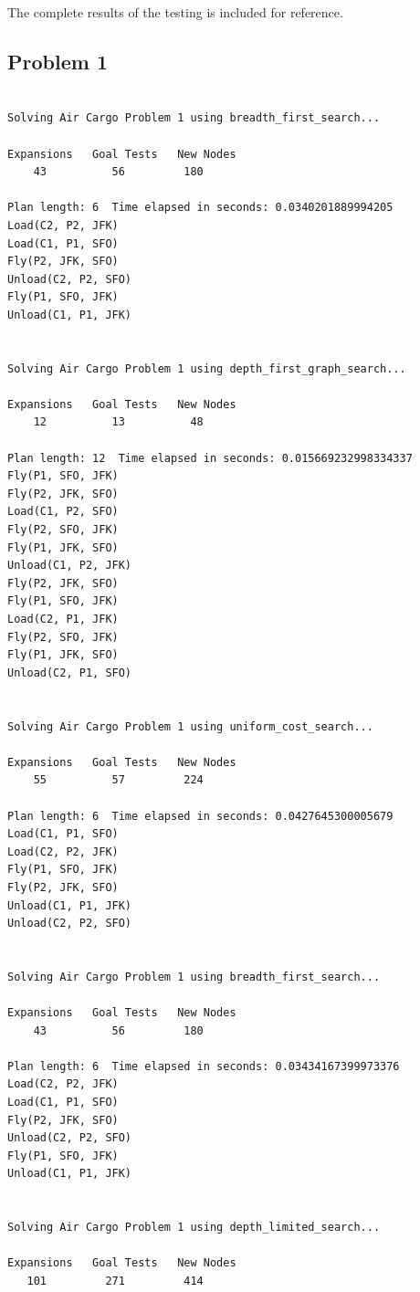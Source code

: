 \documentclass[10pt, a4paper,english]{article}
\begin{document}
The complete results of the testing is included for reference.

\subsection{Problem 1}
\begin{lstlisting}

Solving Air Cargo Problem 1 using breadth_first_search...

Expansions   Goal Tests   New Nodes
    43          56         180    

Plan length: 6  Time elapsed in seconds: 0.0340201889994205
Load(C2, P2, JFK)
Load(C1, P1, SFO)
Fly(P2, JFK, SFO)
Unload(C2, P2, SFO)
Fly(P1, SFO, JFK)
Unload(C1, P1, JFK)


Solving Air Cargo Problem 1 using depth_first_graph_search...

Expansions   Goal Tests   New Nodes
    12          13          48    

Plan length: 12  Time elapsed in seconds: 0.015669232998334337
Fly(P1, SFO, JFK)
Fly(P2, JFK, SFO)
Load(C1, P2, SFO)
Fly(P2, SFO, JFK)
Fly(P1, JFK, SFO)
Unload(C1, P2, JFK)
Fly(P2, JFK, SFO)
Fly(P1, SFO, JFK)
Load(C2, P1, JFK)
Fly(P2, SFO, JFK)
Fly(P1, JFK, SFO)
Unload(C2, P1, SFO)


Solving Air Cargo Problem 1 using uniform_cost_search...

Expansions   Goal Tests   New Nodes
    55          57         224    

Plan length: 6  Time elapsed in seconds: 0.0427645300005679
Load(C1, P1, SFO)
Load(C2, P2, JFK)
Fly(P1, SFO, JFK)
Fly(P2, JFK, SFO)
Unload(C1, P1, JFK)
Unload(C2, P2, SFO)


Solving Air Cargo Problem 1 using breadth_first_search...

Expansions   Goal Tests   New Nodes
    43          56         180    

Plan length: 6  Time elapsed in seconds: 0.03434167399973376
Load(C2, P2, JFK)
Load(C1, P1, SFO)
Fly(P2, JFK, SFO)
Unload(C2, P2, SFO)
Fly(P1, SFO, JFK)
Unload(C1, P1, JFK)


Solving Air Cargo Problem 1 using depth_limited_search...

Expansions   Goal Tests   New Nodes
   101         271         414    


\end{lstlisting}
\end{document}
